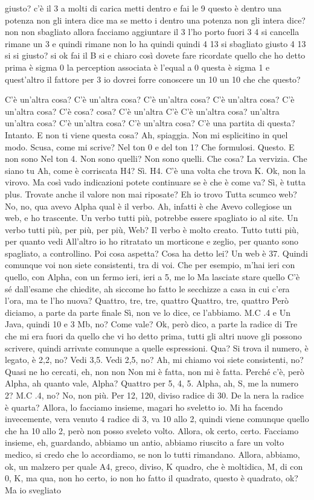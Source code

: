 \begin{soluzione}
{giusto? c'è il 3 a molti di carica metti dentro e fai le 9 questo è dentro una potenza non gli intera dice ma se metto i dentro una potenza non gli intera dice? non non sbagliato allora facciamo aggiuntare il 3 l'ho porto fuori 3 4 si cancella rimane un 3 e quindi rimane non lo ha quindi quindi 4 13 si sbagliato giusto 4 13 si si giusto? si ok fai il B si e chiaro così dovete fare ricordate quello che ho detto prima è sigma 0 la perception associata è l'equal a 0 questa è sigma 1 e quest'altro il fattore per 3 io dovrei forre conoscere un 10 un 10 che che questo? 
      
   C'è un'altra cosa? C'è un'altra cosa? C'è un'altra cosa? C'è un'altra cosa? C'è un'altra cosa? C'è cosa? cosa? C'è un'altra C'è C'è un'altra cosa? un'altra un'altra cosa? C'è un'altra cosa? C'è un'altra cosa? C'è una partita di questa? Intanto. E non ti viene questa cosa? Ah, spiaggia. Non mi esplicitino in quel modo. Scusa, come mi scrive? Nel ton 0 e del ton 1? Che formulosi. Questo. E non sono Nel ton 4. Non sono quelli? Non sono quelli. Che cosa? La vervizia. Che siano tu Ah, come è corriscata H4? Sì. H4. C'è una volta che trova K. Ok, non la virovo. Ma così vado indicazioni potete continuare se è che è come va? Sì, è tutta plus. Trovate anche il valore non mai riposate? Eh io trovo Tutta scumco web? No, no, qua avevo Alpha qual è il verbo. Ah, infatti è che Avevo collegiose un web, e ho trascente. Un verbo tutti più, potrebbe essere spagliato io al site. Un verbo tutti più, per più, per più, Web? Il verbo è molto creato. Tutto tutti più, per quanto vedi All'altro io ho ritratato un morticone e zeglio, per quanto sono spagliato, a controllino. Poi cosa aspetta? Cosa ha detto lei? Un web è 37. Quindi comunque voi non siete consistenti, tra di voi. Che per esempio, m'hai ieri con quello, con Alpha, con un fermo ieri, ieri a 5, me lo Ma lasciate stare quello C'è sé dall'esame che chiedite, ah siccome ho fatto le secchizze a casa in cui c'era l'ora, ma te l'ho nuova? Quattro, tre, tre, quattro Quattro, tre, quattro Però diciamo, a parte da parte finale Sì, non ve lo dice, ce l'abbiamo. M.C .4 e Un Java, quindi 10 e 3 Mb, no? Come vale? Ok, però dico, a parte la radice di Tre che mi era fuori da quello che vi ho detto prima, tutti gli altri nuove gli possono scrivere, quindi arrivate comunque a quelle espressioni. Qua? Si trova il numero, è legato, è 2,2, no? Vedi 3,5. Vedi 2,5, no? Ah, mi chiamo voi siete consistenti, no? Quasi ne ho cercati, eh, non non Non mi è fatta, non mi è fatta. Perché c'è, però Alpha, ah quanto vale, Alpha? Quattro per 5, 4, 5. Alpha, ah, S, me la numero 2? M.C .4, no? No, non più. Per 12, 120, diviso radice di 30. De la nera la radice è quarta? Allora, lo facciamo insieme, magari ho sveletto io. Mi ha facendo invecemente, vera venuto 4 radice di 3, va 10 allo 2, quindi viene comunque quello che ha 10 allo 2, però non posso sveleto volto. Allora, ok certo, certo. Facciamo insieme, eh, guardando, abbiamo un antio, abbiamo riuscito a fare un volto medico, si credo che lo accordiamo, se non lo tutti rimandano. Allora, abbiamo, ok, un malzero per quale A4, greco, diviso, K quadro, che è moltidica, M, di con 0, K, ma qua, non ho certo, io non ho fatto il quadrato, questo è quadrato, ok? Ma io svegliato }
\end{soluzione}
